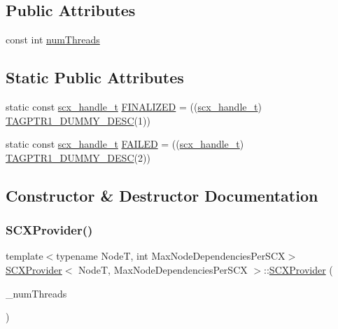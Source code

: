 \subsection*{Public Attributes}
\begin{DoxyCompactItemize}
\item 
const int \hyperlink{classSCXProvider_a69d5eba7f068aaa3c10898524d3e3757}{num\+Threads}
\end{DoxyCompactItemize}
\subsection*{Static Public Attributes}
\begin{DoxyCompactItemize}
\item 
static const \hyperlink{scx__provider_8h_a368fa55a4b553010913289d3cbe6ce22}{scx\+\_\+handle\+\_\+t} \hyperlink{classSCXProvider_a324568fae39abebab2a9c83e628fa7ad}{F\+I\+N\+A\+L\+I\+Z\+ED} = ((\hyperlink{scx__provider_8h_a368fa55a4b553010913289d3cbe6ce22}{scx\+\_\+handle\+\_\+t}) \hyperlink{descriptors__impl_8h_a2266c3e52da603438177ca5100c721a1}{T\+A\+G\+P\+T\+R1\+\_\+\+D\+U\+M\+M\+Y\+\_\+\+D\+E\+SC}(1))
\item 
static const \hyperlink{scx__provider_8h_a368fa55a4b553010913289d3cbe6ce22}{scx\+\_\+handle\+\_\+t} \hyperlink{classSCXProvider_ab51db5cf42bf7e0e5a3dbac50db175fa}{F\+A\+I\+L\+ED} = ((\hyperlink{scx__provider_8h_a368fa55a4b553010913289d3cbe6ce22}{scx\+\_\+handle\+\_\+t}) \hyperlink{descriptors__impl_8h_a2266c3e52da603438177ca5100c721a1}{T\+A\+G\+P\+T\+R1\+\_\+\+D\+U\+M\+M\+Y\+\_\+\+D\+E\+SC}(2))
\end{DoxyCompactItemize}


\subsection{Constructor \& Destructor Documentation}
\mbox{\label{classSCXProvider_a98e2838c5e388b23143b4ac68721ca33}} 
\subsubsection{\texorpdfstring{S\+C\+X\+Provider()}{SCXProvider()}}
{\footnotesize\ttfamily template$<$typename NodeT, int Max\+Node\+Dependencies\+Per\+S\+CX$>$ \\
\hyperlink{classSCXProvider}{S\+C\+X\+Provider}$<$ NodeT, Max\+Node\+Dependencies\+Per\+S\+CX $>$\+::\hyperlink{classSCXProvider}{S\+C\+X\+Provider} (\begin{DoxyParamCaption}\item[{const int}]{\+\_\+num\+Threads }\end{DoxyParamCaption})\hspace{0.3cm}{\ttfamily [inline]}}



